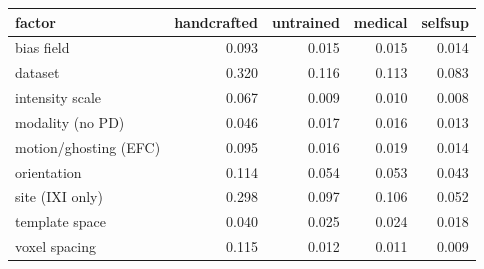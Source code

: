 \begin{tabular}{lrrrr}
\toprule
factor & handcrafted & untrained & medical & selfsup \\
\midrule
bias field & 0.093 & 0.015 & 0.015 & 0.014 \\
dataset & 0.320 & 0.116 & 0.113 & 0.083 \\
intensity scale & 0.067 & 0.009 & 0.010 & 0.008 \\
modality (no PD) & 0.046 & 0.017 & 0.016 & 0.013 \\
motion/ghosting (EFC) & 0.095 & 0.016 & 0.019 & 0.014 \\
orientation & 0.114 & 0.054 & 0.053 & 0.043 \\
site (IXI only) & 0.298 & 0.097 & 0.106 & 0.052 \\
template space & 0.040 & 0.025 & 0.024 & 0.018 \\
voxel spacing & 0.115 & 0.012 & 0.011 & 0.009 \\
\bottomrule
\end{tabular}
